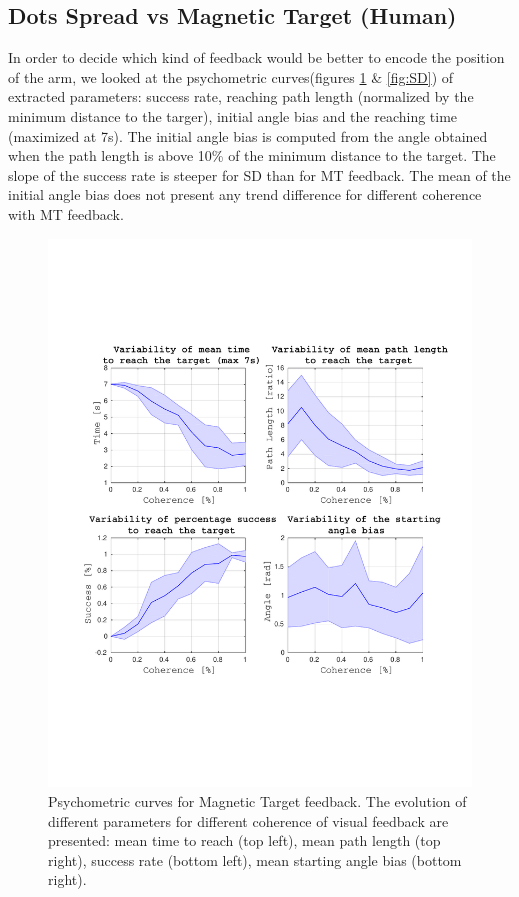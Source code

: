 \documentclass[preprint,12pt]{elsarticle}
\begin{document}
\subsection{Dots Spread vs Magnetic Target (Human)}
In order to decide which kind of feedback would be better to encode the position of the arm, we looked at the psychometric curves(figures \ref{fig:MT} \& \ref{fig:SD}) of extracted parameters: success rate, reaching path length (normalized by the minimum distance to the targer), initial angle bias and the reaching time (maximized at 7s). The initial angle bias is computed from the angle obtained when the path length is above 10\% of the minimum distance to the target. The slope of the success rate is steeper for SD than for MT feedback. The mean of the initial angle bias does not present any trend difference for different coherence with MT feedback.
\begin{figure}[htbp]
\centering
\includegraphics[width=1\textwidth,trim={1.5cm 5cm 1.2cm 5cm},clip]{figures/MD_mean_human.pdf}
\caption{Psychometric curves for Magnetic Target feedback. The evolution of different parameters for different coherence of visual feedback are presented: mean time to reach (top left), mean path length (top right), success rate (bottom left), mean starting angle bias (bottom right).}
\label{fig:MT}
\end{figure}
\end{document}
